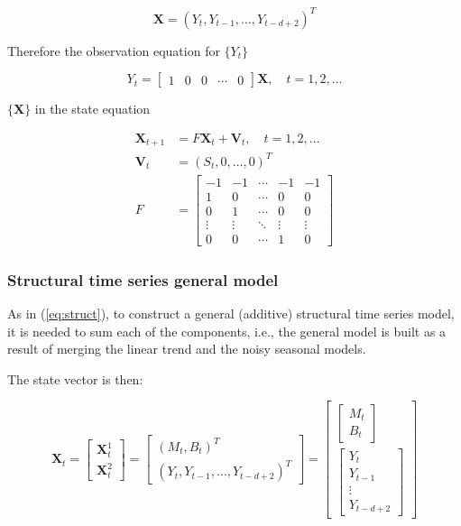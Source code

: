 \begin{equation}
	\bm{X} = (Y_t, Y_{t-1}, \ldots, Y_{t-d+2})^T
\end{equation}

Therefore the observation equation for $\{Y_t\}$

\begin{equation}
	Y_t = \begin{bmatrix}1 & 0 & 0 & \cdots & 0\end{bmatrix} \bm{X}, \quad t=1,2,\ldots
\end{equation}

$\{\bm{X}\}$ in the state equation

\begin{align}
	\bm{X}_{t+1} &= F\bm{X}_t + \bm{V}_t , \quad t=1,2,\dots\\
	\bm{V}_t &= (S_t, 0, \ldots, 0)^T \label{eq:V_noise} \\
	F &= 
	\begin{bmatrix}
		-1		& -1		& \cdots	& -1		& -1 		\\
		1		&  0 		& \cdots 	&  0		& 0  		\\
		0		&  1 		& \cdots 	&  0		& 0  		\\
		\vdots	& \vdots	& \ddots	& \vdots	& \vdots	\\
		0		&  0		& \cdots 	&  1		& 0		
	\end{bmatrix}\label{eq:F_noise}
\end{align}



\subsubsection{Structural time series general model}

As in (\ref{eq:struct}), to construct a general (additive) structural time series model, it is needed to sum each of the components, i.e., the general model is built as a result of merging the linear trend and the noisy seasonal models.

The state vector is then:

\begin{equation}
	\bm{X}_t = 
	\begin{bmatrix}
		\bm{X}_t^1 \\
		\bm{X}_t^2
	\end{bmatrix} =
	\begin{bmatrix}
		(M_t, B_t)^T \\
		(Y_t, Y_{t-1}, \ldots, Y_{t-d+2})^T
	\end{bmatrix} = 
	\begin{bmatrix}
		\begin{bmatrix}
			M_t \\
			B_t
		\end{bmatrix} \\
		\begin{bmatrix}
			Y_t \\
			Y_{t-1} \\
			\vdots \\
			Y_{t-d+2}
		\end{bmatrix}
	\end{bmatrix}
\end{equation}

